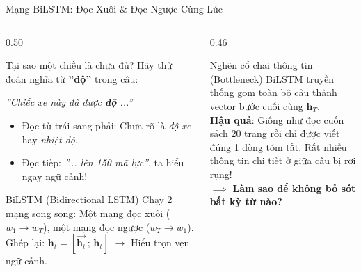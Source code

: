 \documentclass[aspectratio=169, 10pt]{beamer}
\begin{document}
\begin{frame}{Mạng BiLSTM: Đọc Xuôi \& Đọc Ngược Cùng Lúc}
  \begin{columns}[T, onlytextwidth]
    \begin{column}{0.50\textwidth}
      \begin{block}{Tại sao một chiều là chưa đủ?}
        \fontsize{7.5}{9.5}\selectfont
        Hãy thử đoán nghĩa từ \textbf{''độ''} trong câu:
        \begin{center}
          \textit{''Chiếc xe này đã được \textbf{độ} ...''}
        \end{center}
        \begin{itemize}\setlength{\itemsep}{0.1em}
          \item Đọc từ trái sang phải: Chưa rõ là \textit{độ xe} hay \textit{nhiệt độ}.
          \item Đọc tiếp: \textit{''... lên 150 mã lực''}, ta hiểu ngay ngữ cảnh!
        \end{itemize}
      \end{block}
      \vspace{0.15cm}
      \begin{exampleblock}{BiLSTM (Bidirectional LSTM)}
        \fontsize{7.5}{9.5}\selectfont
        Chạy 2 mạng song song: Một mạng đọc xuôi ($w_1 \to w_T$), một mạng đọc ngược ($w_T \to w_1$). Ghép lại: $\mathbf{h}_t = [\overrightarrow{\mathbf{h}_t} \,;\, \overleftarrow{\mathbf{h}_t}]$ $\to$ Hiểu trọn vẹn ngữ cảnh.
      \end{exampleblock}
    \end{column}
    \hfill
    \begin{column}{0.46\textwidth}
      \begin{alertblock}{Nghẽn cổ chai thông tin (Bottleneck)}
        \fontsize{7.5}{9.5}\selectfont
        BiLSTM truyền thống gom toàn bộ câu thành vector bước cuối cùng $\mathbf{h}_T$.\\
        \textbf{Hậu quả}: Giống như đọc cuốn sách 20 trang rồi chỉ được viết đúng 1 dòng tóm tắt. Rất nhiều thông tin chi tiết ở giữa câu bị rơi rụng!\\
        \vspace{0.15cm}
        $\implies$ \textbf{Làm sao để không bỏ sót bất kỳ từ nào?}
      \end{alertblock}
    \end{column}
  \end{columns}
\end{frame}
\end{document}
